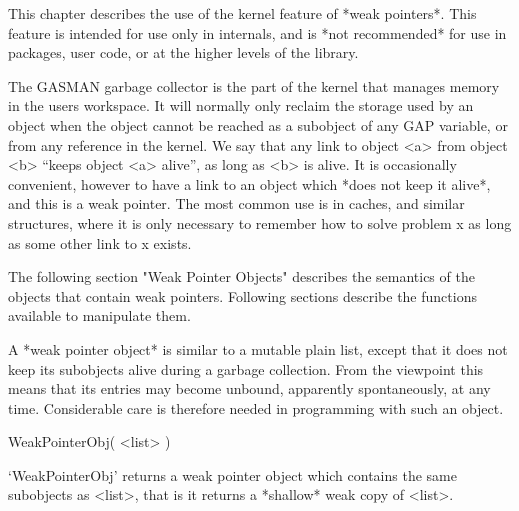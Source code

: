 

This chapter describes the use of the kernel feature of *weak pointers*. This
feature is  intended    for use only   in  {\GAP}  internals,  and  is   *not
recommended* for use in {\GAP} packages,  user code,  or at the higher levels
of the library.

The GASMAN garbage collector is the part of the kernel that manages memory in
the users workspace.  It will  normally only reclaim  the storage used by  an
object when the object cannot be reached as a subobject  of any GAP variable,
or from any reference in the kernel.  We say that any link to object <a> from
object  <b>  ``keeps object <a>  alive'',  as long  as <b>  is  alive.  It is
occasionally convenient, however to have a link to an  object which *does not
keep   it alive*, and this  is  a weak pointer.   The  most common  use is in
caches, and similar structures, where it is only necessary to remember how to
solve problem x as long as some other link to x exists.

The  following section "Weak Pointer  Objects" describes the semantics of the
objects that contain weak pointers. Following sections describe the functions
available to manipulate them.


A  *weak pointer object* is  similar to a  mutable plain list, except that it
does  not  keep its subobjects alive   during a garbage collection.  From the
{\GAP} viewpoint this  means that its  entries may become unbound, apparently
spontaneously,  at  any   time.  Considerable care   is  therefore needed  in
programming with such an object.

\nolabel

\>WeakPointerObj( <list> )

`WeakPointerObj' returns  a  weak pointer object  which contains  the same
subobjects as <list>, that is it returns a *shallow* weak copy of <list>.

